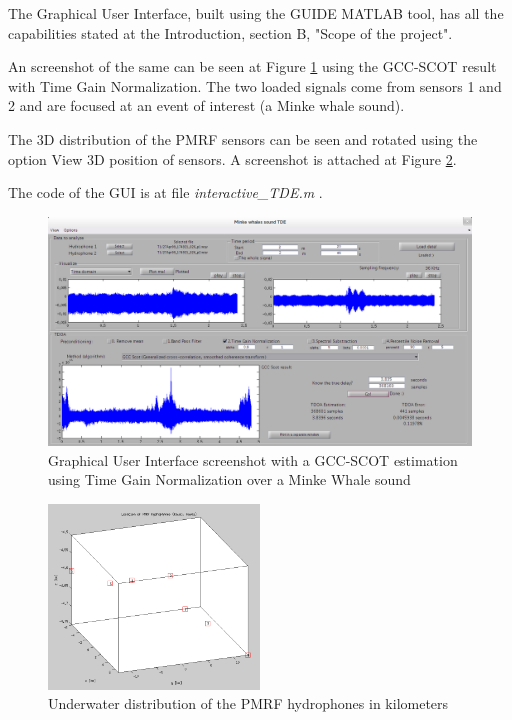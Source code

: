 The Graphical User Interface, built using the GUIDE MATLAB tool, has all the capabilities stated at the Introduction, section B, "Scope of the project".

An screenshot of the same can be seen at Figure \ref{fig:GUI} using the GCC-SCOT result with Time Gain Normalization. The two loaded signals come from sensors 1 and 2 and are focused at an event of interest (a Minke whale sound).

The 3D distribution of the PMRF sensors can be seen and rotated using the option View 3D position of sensors. A screenshot is attached at Figure \ref{fig:3D_sensors}.

The code of the GUI is at file \emph{interactive\_TDE.m}\cite{gui.m} .

\begin{figure}[!t]
	\begin{center}
		\includegraphics[width=1\textwidth]{figures/GUI_SCOT.png}
	\end{center}
	\caption{Graphical User Interface screenshot with a GCC-SCOT estimation using Time Gain Normalization over a Minke Whale sound}
	\label{fig:GUI}
\end{figure}

\begin{figure}[htb]
	\begin{center}
		\includegraphics[width=0.5\textwidth]{figures/3D_sensors.png}
	\end{center}
	\caption{Underwater distribution of the PMRF hydrophones in kilometers}
	\label{fig:3D_sensors}
\end{figure}
